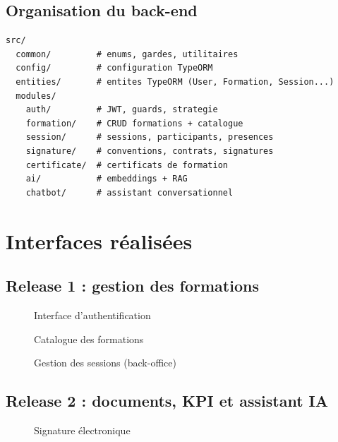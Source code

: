 \documentclass[12pt,a4paper]{report}
\begin{document}
\subsection{Organisation du back-end}
\begin{lstlisting}[caption={Extrait : organisation modulaire du back-end (NestJS)}]
src/
  common/         # enums, gardes, utilitaires
  config/         # configuration TypeORM
  entities/       # entites TypeORM (User, Formation, Session...)
  modules/
    auth/         # JWT, guards, strategie
    formation/    # CRUD formations + catalogue
    session/      # sessions, participants, presences
    signature/    # conventions, contrats, signatures
    certificate/  # certificats de formation
    ai/           # embeddings + RAG
    chatbot/      # assistant conversationnel
\end{lstlisting}

\section{Interfaces réalisées}
\subsection{Release 1 : gestion des formations}
\begin{figure}[H]
\centering
{}
\caption{Interface d'authentification}
\end{figure}

\begin{figure}[H]
\centering
{}
\caption{Catalogue des formations}
\end{figure}

\begin{figure}[H]
\centering
{}
\caption{Gestion des sessions (back-office)}
\end{figure}

\subsection{Release 2 : documents, KPI et assistant IA}
\begin{figure}[H]
\centering
{}
\caption{Signature électronique}
\end{figure}
\end{document}
